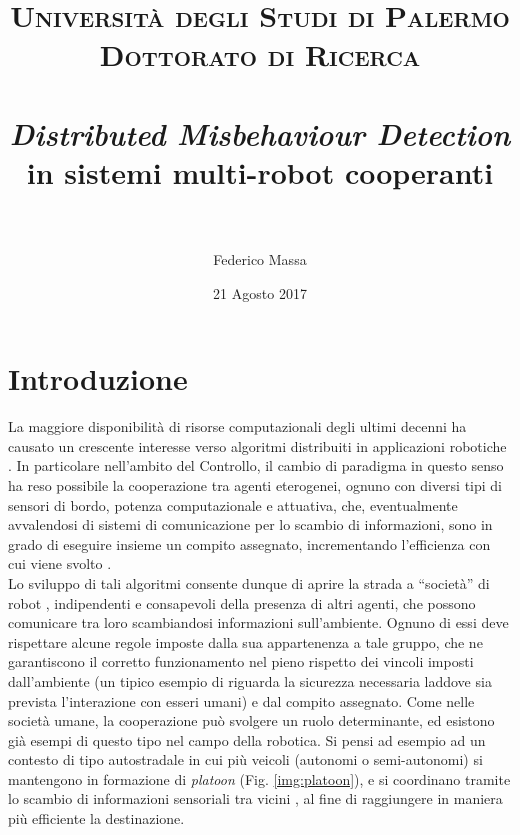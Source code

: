 \documentclass[paper=a4, fontsize=11pt]{scrartcl} %
\title{	
\normalfont \normalsize 
\textsc{Università degli Studi di Palermo}\\
\textsc{Dottorato di Ricerca}\\[25pt] %
\horrule{0.5pt} \\[0.4cm] %
\huge \textit{Distributed Misbehaviour Detection} in sistemi multi-robot cooperanti\\ %
\horrule{2pt} \\[0.5cm] %
}
\author{Federico Massa} %
\date{\normalsize 21 Agosto 2017} %
\numberwithin{equation}{section} %
\numberwithin{table}{section} %
\begin{document}

\maketitle %


\section{Introduzione}

La maggiore disponibilità di risorse computazionali degli ultimi decenni ha causato un crescente interesse verso algoritmi distribuiti in applicazioni robotiche \cite{Lynch-book}. In particolare nell'ambito del Controllo, il cambio di paradigma in questo senso ha reso possibile la cooperazione tra agenti eterogenei, ognuno con
diversi tipi di sensori di bordo, potenza computazionale e attuativa, che, eventualmente avvalendosi di sistemi di comunicazione per lo scambio di informazioni, sono in grado di eseguire insieme un compito assegnato,
incrementando l'efficienza con cui viene svolto \cite{coordination1}. \\

Lo sviluppo di tali algoritmi consente dunque di aprire la strada a ``società'' di robot    \cite{ram10-bfp}, indipendenti e consapevoli della presenza di altri agenti, che possono comunicare tra loro scambiandosi
informazioni sull'ambiente. 
Ognuno di essi deve rispettare alcune regole
imposte dalla sua appartenenza a tale gruppo, che ne garantiscono il corretto funzionamento nel pieno rispetto dei vincoli imposti dall'ambiente
(un tipico esempio di riguarda la sicurezza necessaria laddove 
sia prevista l'interazione con esseri umani) e dal compito assegnato. 
Come nelle società umane, la cooperazione
può svolgere un ruolo determinante, ed esistono già esempi di questo
tipo nel campo della robotica. Si pensi ad esempio ad un contesto di tipo autostradale in cui 
più veicoli (autonomi o semi-autonomi) si mantengono in formazione di \textit{platoon} (Fig. \ref{img:platoon}), e si coordinano tramite lo scambio di informazioni sensoriali tra vicini \cite{platoon1}, al 
fine di raggiungere in maniera più efficiente la destinazione. \\
\end{document}
